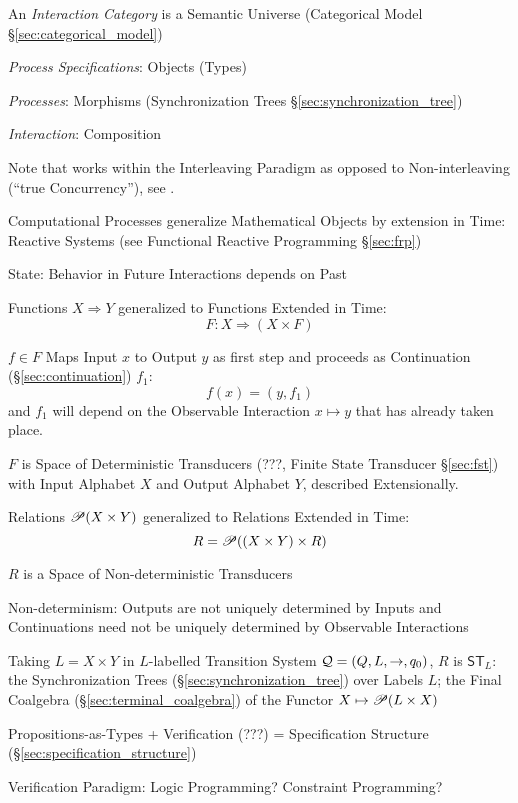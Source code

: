 An \emph{Interaction Category} is a Semantic Universe (Categorical
Model \S\ref{sec:categorical_model})

\emph{Process Specifications}: Objects (Types)

\emph{Processes}: Morphisms (Synchronization Trees
\S\ref{sec:synchronization_tree})

\emph{Interaction}: Composition

\fist Note that \cite{abramsky-gay-nagarajan96} works within the
Interleaving Paradigm as opposed to Non-interleaving (``true
Concurrency''), see \cite{winskel-nielsen93}.

Computational Processes generalize Mathematical Objects by extension
in Time: Reactive Systems (see Functional Reactive Programming
\S\ref{sec:frp})

State: Behavior in Future Interactions depends on Past

Functions $X \Rightarrow Y$ generalized to Functions Extended in Time:
\[
  F : X \Rightarrow (X \times F)
\]

$f \in F$ Maps Input $x$ to Output $y$ as first step and proceeds as
Continuation (\S\ref{sec:continuation}) $f_1$:
\[
  f(x) = (y,f_1)
\]
and $f_1$ will depend on the Observable Interaction $x \mapsto y$ that
has already taken place.

$F$ is Space of Deterministic Transducers (???, Finite State
Transducer \S\ref{sec:fst}) with Input Alphabet $X$ and Output
Alphabet $Y$, described Extensionally.

Relations $\mathscr{P}(X \times Y)$ generalized to Relations Extended in
Time:
\[
  R = \mathscr{P}((X \times Y) \times R)
\]

$R$ is a Space of Non-deterministic Transducers

Non-determinism: Outputs are not uniquely determined by Inputs and
Continuations need not be uniquely determined by Observable Interactions

Taking $L = X \times Y$ in $L$-labelled Transition System $\mathcal{Q} =
(Q,L,\rightarrow,q_0)$, $R$ is $\mathsf{ST}_L$: the Synchronization
Trees (\S\ref{sec:synchronization_tree}) over Labels $L$; the Final
Coalgebra (\S\ref{sec:terminal_coalgebra}) of the Functor $X \mapsto
\mathscr{P}(L \times X)$


\asterism


Propositions-as-Types + Verification (???) = Specification Structure
(\S\ref{sec:specification_structure})

Verification Paradigm: Logic Programming? Constraint Programming?


